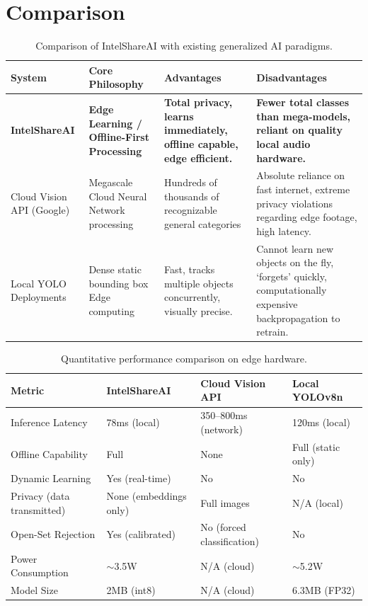 \documentclass[12pt,a4paper]{report}
\begin{document}
\section{Comparison}
\begin{table}[H]
    \caption{Comparison of IntelShareAI with existing generalized AI paradigms.}
    \vspace{1em}
    \centering
    \renewcommand{\arraystretch}{1.2}
    \small
    \begin{tabular}{|p{3cm}|p{3.5cm}|p{3.5cm}|p{3.5cm}|}
        \hline
        \textbf{System} & \textbf{Core Philosophy} & \textbf{Advantages} & \textbf{Disadvantages} \\
        \hline
        \textbf{IntelShareAI} & \textbf{Edge Learning / Offline-First Processing} & \textbf{Total privacy, learns immediately, offline capable, edge efficient.} & \textbf{Fewer total classes than mega-models, reliant on quality local audio hardware.} \\
        \hline
        Cloud Vision API (Google) & Megascale Cloud Neural Network processing & Hundreds of thousands of recognizable general categories & Absolute reliance on fast internet, extreme privacy violations regarding edge footage, high latency. \\
        \hline
        Local YOLO Deployments & Dense static bounding box Edge computing & Fast, tracks multiple objects concurrently, visually precise. & Cannot learn new objects on the fly, `forgets' quickly, computationally expensive backpropagation to retrain. \\
        \hline
    \end{tabular}
\end{table}

\begin{table}[H]
    \caption{Quantitative performance comparison on edge hardware.}
    \vspace{0.5em}
    \centering
    \renewcommand{\arraystretch}{1.2}
    \small
    \begin{tabular}{|p{4cm}|p{3cm}|p{3cm}|p{3cm}|}
        \hline
        \textbf{Metric} & \textbf{IntelShareAI} & \textbf{Cloud Vision API} & \textbf{Local YOLOv8n} \\
        \hline
        Inference Latency & 78ms (local) & 350--800ms (network) & 120ms (local) \\
        \hline
        Offline Capability & Full & None & Full (static only) \\
        \hline
        Dynamic Learning & Yes (real-time) & No & No \\
        \hline
        Privacy (data transmitted) & None (embeddings only) & Full images & N/A (local) \\
        \hline
        Open-Set Rejection & Yes (calibrated) & No (forced classification) & No \\
        \hline
        Power Consumption & $\sim$3.5W & N/A (cloud) & $\sim$5.2W \\
        \hline
        Model Size & 2MB (int8) & N/A (cloud) & 6.3MB (FP32) \\
        \hline
    \end{tabular}
\end{table}
\end{document}
